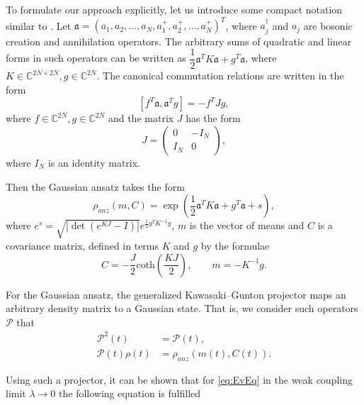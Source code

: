 \documentclass[12pt]{article}
\theoremstyle{definition}
\newcommand{\mf}[1]{\mathfrak{#1}}
\def\la {\lambda}
\begin{document}
	To formulate our approach explicitly,  let us introduce some compact notation similar to \cite{Dis}. Let  $\mf{a} = (a_1, a_2, \ldots, a_N, a_1^+, a_2^+,\ldots,a_N^+)^T$, where $a_j^{\dagger}$ and $a_j$ are bosonic creation and annihilation operators. The arbitrary sums of quadratic and linear forms in such operators can be written as $\dfrac{1}{2}\mf{a}^TK\mf{a} + g^T\mf{a}$, where $K \in \mathbb{C}^{2N \times 2N}, g \in \mathbb{C}^{2N}$. The canonical commutation relations are written in the form 
	\begin{equation}
		\label{eq:ComRel}
		[f^T\mf{a},\mf{a}^Tg] = -f^TJg,
	\end{equation}
	where $f \in \mathbb{C}^{2N}, g \in \mathbb{C}^{2N}$ and the matrix $J$ has the form
	\begin{equation*}
		J = \begin{pmatrix}
			0 & -I_N \\
			I_N & 0
		\end{pmatrix},
	\end{equation*}
	where $I_N$ is an identity matrix.
	
	
	Then the Gaussian ansatz takes the form
	\begin{equation}
		\label{eq:ProjForAv}
		\rho_{anz}(m, C)=\exp \left(\dfrac{1}{2}\mathfrak{a}^TK\mathfrak{a} + g^T\mathfrak{a} + s\right),
	\end{equation}
	where $e^s = \sqrt{|\det(e^{KJ} - I)|}e^{\frac{1}{2}g^TK^{-1}g}$, $ m $ is the vector of means and $ C $ is a covariance matrix, defined in terms $ K $ and $ g $ by the formulae \cite{Dis}
	\begin{equation}
		\label{eq:ConOfCFromK}
		C = -\frac{J}{2}\text{coth}\left(\frac{KJ}{2}\right), \qquad m = - K^{-1} g.
	\end{equation}
	
	For the  Gaussian ansatz, the   generalized Kawasaki–Gunton projector maps an arbitrary density matrix to a Gaussian state. That is, we consider such operators $\mathcal{P}$ that
	\begin{align*}
		\mathcal{P}^2(t)& = \mathcal{P}(t), \\
		\mathcal{P}(t)\rho(t)& = \rho_{anz}(m(t), C(t)).
	\end{align*}
	
	Using such a projector, it can be shown that for  \eqref{eq:EvEq}  in the weak coupling limit $\la \rightarrow 0$ the following equation is fulfilled
	
\end{document}
